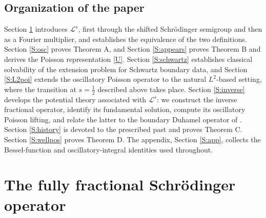\documentclass[11pt,letter]{amsart}
\numberwithin{equation}{section}
\newcommand{\Le}{\mathcal L}
\numberwithin{equation}{section}
\begin{document}
\subsection{Organization of the paper}

Section \ref{S:fullyfra} introduces $\Le^s$, first through the shifted
Schr\"odinger semigroup and then as a Fourier multiplier, and establishes the
equivalence of the two definitions. Section \ref{S:osc} proves Theorem A, and
Section \ref{S:appears} proves Theorem B and derives the Poisson representation
\eqref{U}. Section \ref{S:schwartz} establishes classical solvability of the
extension problem for Schwartz boundary data, and Section \ref{S:L2poi} extends
the oscillatory Poisson operator to the natural $L^2$-based setting, where the
transition at $s=\frac12$ described above takes place. Section \ref{S:inverse}
develops the potential theory associated with $\Le^s$: we construct the inverse
fractional operator, identify its fundamental solution, compute its oscillatory
Poisson lifting, and relate the latter to the boundary Duhamel operator of
\cite{GS2}. Section \ref{S:history} is devoted to the prescribed past and proves
Theorem C. Section \ref{S:wellpos} proves Theorem D. The appendix,
Section \ref{S:app}, collects the Bessel-function and oscillatory-integral
identities used throughout.


\section{The fully fractional Schr\"odinger operator}\label{S:fullyfra}
\end{document}

